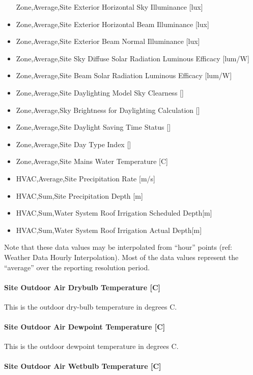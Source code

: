 \begin{itemize}
  Zone,Average,Site Exterior Horizontal Sky Illuminance {[}lux{]}
\item
  Zone,Average,Site Exterior Horizontal Beam Illuminance {[}lux{]}
\item
  Zone,Average,Site Exterior Beam Normal Illuminance {[}lux{]}
\item
  Zone,Average,Site Sky Diffuse Solar Radiation Luminous Efficacy {[}lum/W{]}
\item
  Zone,Average,Site Beam Solar Radiation Luminous Efficacy {[}lum/W{]}
\item
  Zone,Average,Site Daylighting Model Sky Clearness {[]}
\item
  Zone,Average,Sky Brightness for Daylighting Calculation {[]}
\item
  Zone,Average,Site Daylight Saving Time Status {[]}
\item
  Zone,Average,Site Day Type Index {[]}
\item
  Zone,Average,Site Mains Water Temperature {[}C{]}
\item
  HVAC,Average,Site Precipitation Rate {[}m/s{]}
\item
  HVAC,Sum,Site Precipitation Depth {[}m{]}
\item
  HVAC,Sum,Water System Roof Irrigation Scheduled Depth{[}m{]}
\item
  HVAC,Sum,Water System Roof Irrigation Actual Depth{[}m{]}
\end{itemize}

Note that these data values may be interpolated from ``hour'' points (ref: Weather Data Hourly Interpolation). Most of the data values represent the ``average'' over the reporting resolution period.

\paragraph{Site Outdoor Air Drybulb Temperature {[}C{]}}\label{site-outdoor-air-drybulb-temperature-c}

This is the outdoor dry-bulb temperature in degrees C.

\paragraph{Site Outdoor Air Dewpoint Temperature {[}C{]}}\label{site-outdoor-air-dewpoint-temperature-c}

This is the outdoor dewpoint temperature in degrees C.

\paragraph{Site Outdoor Air Wetbulb Temperature {[}C{]}}\label{site-outdoor-air-wetbulb-temperature-c}

